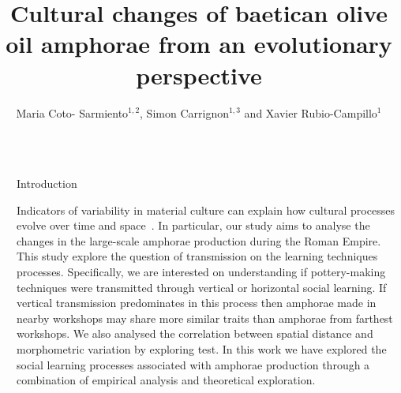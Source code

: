 \documentclass[final]{beamer}
\title{Cultural changes of baetican olive oil amphorae from an evolutionary perspective}
\author{Maria Coto- Sarmiento$^{1,2}$, Simon Carrignon$^{1,3}$ and Xavier Rubio-Campillo$^{1}$} %
\institute{$^1$Barcelona Supercomputing Center -- $^2$University of Barcelona -- $^3$Universitat Pompeu Fabra} %
\newlength{\sepwid}
\newlength{\onecolwid}
\begin{document}

\setlength{\belowcaptionskip}{2ex} %
\setlength\belowdisplayshortskip{2ex} %

\begin{frame}[t] %

\vspace{-1cm}

\begin{columns}[t] %

\begin{column}{\sepwid}\end{column} %

\begin{column}{\onecolwid} %


\begin{block}{Introduction}

\justify

Indicators of variability in material culture can explain how cultural processes evolve over time and space~\cite{lipo}. In particular, our study aims to analyse the changes in the large-scale amphorae production during the Roman Empire. This study explore the question of transmission on the learning techniques processes. Specifically, we are interested on understanding if pottery-making techniques were transmitted through vertical or horizontal social learning. If vertical transmission predominates in this process then amphorae made in nearby workshops may share more similar traits than amphorae from farthest workshops. We also analysed the correlation between spatial distance and morphometric variation by exploring test. In this work we have explored the social learning processes associated with amphorae production through a combination of empirical analysis and theoretical exploration.   




\end{block}
\end{column}
\end{columns}
\end{frame}
\end{document}
